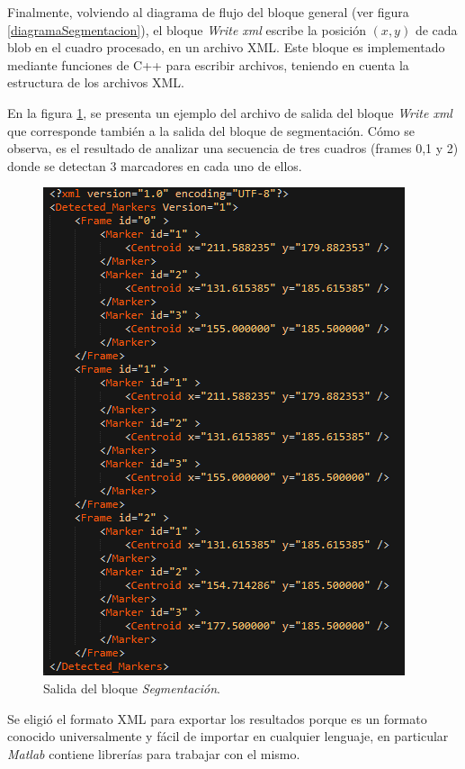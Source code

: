 Finalmente, volviendo al diagrama de flujo del bloque general (ver figura \ref{diagramaSegmentacion}), el bloque \emph{Write xml} escribe la posición $(x,y)$ de cada blob en el cuadro procesado, en un archivo XML\cite{xml}. Este bloque es implementado mediante funciones de C++ para escribir archivos, teniendo en cuenta la estructura de los archivos XML\cite{xml}.

En la figura \ref{salidaxml}, se presenta un ejemplo del archivo de salida del bloque \emph{Write xml} que corresponde también a la salida del bloque de segmentación. Cómo se observa, es el resultado de analizar una secuencia de tres cuadros (frames 0,1 y 2) donde se detectan 3 marcadores en cada uno de ellos.

\begin{figure}[ht!]
\begin{center}
\includegraphics[scale=0.9]{img/salidaXml.png}
\end{center}
\caption{Salida del bloque \emph{Segmentación}.}
\label{salidaxml}
\end{figure}


 Se eligió el formato XML\cite{xml} para exportar los resultados porque es un formato conocido universalmente y fácil de importar en cualquier lenguaje, en particular \emph{Matlab} contiene librerías para trabajar con el mismo.

